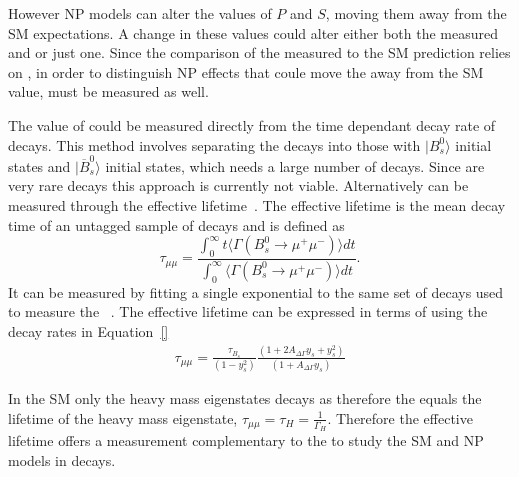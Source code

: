 However NP models can alter the values of $P$ and $S$, moving them away from the SM expectations. A change in these values could alter either both the measured \BF and \ADF or just one. Since the comparison of the measured \BF to the SM prediction relies on \ADG, in order to distinguish NP effects that coule move the \BF away from the SM value, \ADG must be measured as well. 

The value of \ADG could be measured directly from the time dependant decay rate of \bsmumu decays. This method involves separating the \bsmumu decays into those with $| B^0_s \rangle$ initial states and $|\overline{B}^0_s\rangle$ initial states, which needs a large number of \bsmumu decays. Since \bsmumu are very rare decays this approach is currently not viable. Alternatively \ADG can be measured through the \bsmumu effective lifetime~\cite{}. The effective lifetime is the mean decay time of an untagged sample of \bsmumu decays and is defined as
\begin{equation}
  \tau_{\mu\mu} = \frac{\int^{\infty}_0 t\langle \Gamma (B^0_s \to \mu^+ \mu^-) \rangle dt}{\int^{\infty}_0 \langle \Gamma (B^0_s \to\mu^+ \mu^-) \rangle dt}.
\label{eq:EL_def}
\end{equation}
It can be measured by fitting a single exponential to the same set of decays used to measure the \BF~\cite{}. The effective lifetime can be expressed in terms of \ADG using the decay rates in Equation~\ref{}
\begin{align}
\tau_{\mu\mu} %
= \frac{\tau_{B_{s}}}{(1 - y_{s}^{2})} \frac{( 1 + 2A_{\Delta\Gamma}y_{s} + y_{s}^{2})}{(1 + A_{\Delta\Gamma}y_{s})}
\end{align}

In the SM only the heavy \bs mass eigenstates decays as \bsmumu therefore the \el equals the lifetime of the heavy mass eigenstate, $\tau_{\mu\mu} = \tau_H = \frac{1}{\Gamma_H}$. Therefore the effective lifetime offers a measurement complementary to the \BFs to study the SM and NP models in \bsmumu decays.

